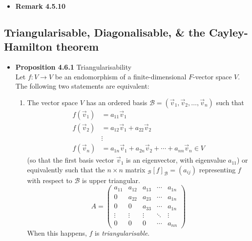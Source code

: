 \documentclass[11pt,a4paper]{article}
\begin{document}
\begin{itemize}
\begin{enumerate}
        \end{enumerate}

    \item \textbf{Remark 4.5.10}

\end{itemize}

\subsection{Triangularisable, Diagonalisable, \& the Cayley-Hamilton theorem}

\begin{itemize}
    \item \textbf{Proposition 4.6.1} Triangularisability \\
        Let $f : V \to V$ be an endomorphism of a finite-dimensional $F$-vector space $V$.
        The following two statements are equivalent:
        \begin{enumerate}
            \item The vector space $V$ has an ordered basis
                $\mathcal{B} = (\vec{v}_1, \vec{v}_2, \ldots, \vec{v}_n)$ such that
                \begin{align*}{}
                    f(\vec{v}_1) &= a_{11}\vec{v}_1 \\
                    f(\vec{v}_2) &= a_{12}\vec{v}_1 + a_{22}\vec{v}_2 \\
                                 &\vdots \\
                    f(\vec{v}_n) &= a_{1n}\vec{v}_1 + a_{2n}\vec{v}_2 + \cdots +
                    a_{nn}\vec{v}_n \in V
                \end{align*}
                (so that the first basis vector $\vec{v}_1$ is an eigenvector,
                with eigenvalue $a_{11}$) or equivalently such that the $n \times n$ matrix
                $_\mathcal{B}{[f]}_\mathcal{B} = (a_{ij})$ representing $f$ with respect to
                $\mathcal{B}$ is upper triangular.
                \[
                    A =
                    \begin{pmatrix}{}
                        a_{11} & a_{12} & a_{13} & \cdots & a_{1n} \\
                        0      & a_{22} & a_{23} & \cdots & a_{1n} \\
                        0      & 0      & a_{33} & \cdots & a_{1n} \\
                        \vdots & \vdots & \vdots & \ddots & \vdots \\
                        0      & 0      & 0      & \cdots & a_{nn}
                    \end{pmatrix}
                \]
                When this happens, $f$ is \emph{triangularisable}.


\end{enumerate}
\end{itemize}
\end{document}
